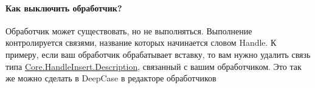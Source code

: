 \paragraph{Как выключить обработчик?}
Обработчик может существовать, но не выполняться. Выполнение контролируется связями, название которых начинается словом Handle. К примеру, если ваш обработчик обрабатывает вставку, то вам нужно удалить связь типа \hyperlink{HandleInsert}{Core.HandleInsert.Description}, связанный с вашим обработчиком. Это так же можно сделать в DeepCase в редакторе обработчиков